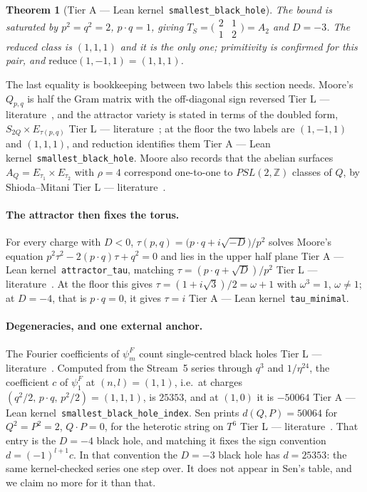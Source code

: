\documentclass[11pt,a4paper]{article}
\newtheorem{theorem}{Theorem}[section]
\theoremstyle{remark}
\newcommand{\tierA}{\colorbox{green!15}{\textsf{\scriptsize Tier A --- Lean kernel}}}
\newcommand{\tierL}{\colorbox{blue!10}{\textsf{\scriptsize Tier L --- literature}}}
\newcommand{\lean}[1]{\texttt{#1}}
\begin{document}
\begin{theorem}[\tierA\ \lean{smallest\_black\_hole}]
The bound is saturated by $p^2=q^2=2$, $p\cdot q=1$, giving $T_S=\bigl(\begin{smallmatrix}2&1\\1&2\end{smallmatrix}\bigr)=A_2$ and $D=-3$. The reduced class is $(1,1,1)$ and it is the only one; primitivity is confirmed for this pair, and $\mathrm{reduce}(1,-1,1)=(1,1,1)$.
\end{theorem}

\noindent The last equality is bookkeeping between two labels this section needs. Moore's $Q_{p,q}$ is half the Gram matrix with the off-diagonal sign reversed \tierL\ \cite[(3.4)--(3.5), ll.~1104--1112]{Moore1998}, and the attractor variety is stated in terms of the doubled form, $S_{2Q}\times E_{\tau(p,q)}$ \tierL\ \cite[(4.27)--(4.29), ll.~1580--1600]{Moore1998}; at the floor the two labels are $(1,-1,1)$ and $(1,1,1)$, and reduction identifies them \tierA\ \lean{smallest\_black\_hole}. Moore also records that the abelian surfaces $A_Q=E_{\tau_1}\times E_{\tau_2}$ with $\rho=4$ correspond one-to-one to $PSL(2,\mathbb{Z})$ classes of $Q$, by Shioda--Mitani \tierL\ \cite[(4.15), ll.~1480--1507]{Moore1998}.

\paragraph{The attractor then fixes the torus.} For every charge with $D<0$, $\tau(p,q)=\bigl(p\cdot q+i\sqrt{-D}\bigr)/p^2$ solves Moore's equation $p^2\tau^2-2(p\cdot q)\tau+q^2=0$ and lies in the upper half plane \tierA\ \lean{attractor\_tau}, matching $\tau=(p\cdot q+\sqrt D)/p^2$ \tierL\ \cite[(4.4a)--(4.6), ll.~1356--1376]{Moore1998}. At the floor this gives $\tau=(1+i\sqrt3)/2=\omega+1$ with $\omega^3=1$, $\omega\neq1$; at $D=-4$, that is $p\cdot q=0$, it gives $\tau=i$ \tierA\ \lean{tau\_minimal}.

\paragraph{Degeneracies, and one external anchor.} The Fourier coefficients of $\psi_m^F$ count single-centred black holes \tierL\ \cite[(1.6), ll.~426--443]{DMZ2012}. Computed from the Stream~5 series through $q^3$ and $1/\eta^{24}$, the coefficient $c$ of $\psi_1^F$ at $(n,l)=(1,1)$, i.e.\ at charges $(q^2/2,\,p\cdot q,\,p^2/2)=(1,1,1)$, is $25353$, and at $(1,0)$ it is $-50064$ \tierA\ \lean{smallest\_black\_hole\_index}. Sen prints $d(Q,P)=50064$ for $Q^2=P^2=2$, $Q\cdot P=0$, for the heterotic string on $T^6$ \tierL\ \cite[l.~6788]{Sen2007}. That entry is the $D=-4$ black hole, and matching it fixes the sign convention $d=(-1)^{l+1}c$. In that convention the $D=-3$ black hole has $d=25353$: the same kernel-checked series one step over. It does not appear in Sen's table, and we claim no more for it than that.
\end{document}
